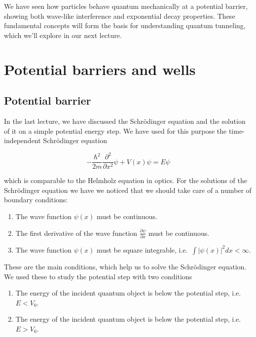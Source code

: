 \documentclass[
  a4paper,
]{book}
\providecommand{\tightlist}{%
  \setlength{\itemsep}{0pt}\setlength{\parskip}{0pt}}
\begin{document}
We have seen how particles behave quantum mechanically at a potential
barrier, showing both wave-like interference and exponential decay
properties. These fundamental concepts will form the basis for
understanding quantum tunneling, which we'll explore in our next
lecture.

\chapter{Potential barriers and
wells}\label{potential-barriers-and-wells}

\section{Potential barrier}\label{potential-barrier}

In the last lecture, we have discussed the Schrödinger equation and the
solution of it on a simple potential energy step. We have used for this
purpose the time-independent Schrödinger equation

\[-\frac{\hbar^2}{2m}\frac{\partial^2}{\partial x^2}\psi + V(x)\psi = E\psi\]

which is comparable to the Helmholz equation in optics. For the
solutions of the Schrödinger equation we have we noticed that we should
take care of a number of boundary conditions:

\begin{enumerate}
\def\labelenumi{\arabic{enumi}.}
\tightlist
\item
  The wave function \(\psi(x)\) must be continuous.
\item
  The first derivative of the wave function
  \(\frac{\partial \psi}{\partial x}\) must be continuous.
\item
  The wave function \(\psi(x)\) must be square integrable,
  i.e.~\(\int |\psi(x)|^2 dx < \infty\).
\end{enumerate}

These are the main conditions, which help us to solve the Schrödinger
equation. We used these to study the potential step with two conditions

\begin{enumerate}
\def\labelenumi{\arabic{enumi}.}
\tightlist
\item
  The energy of the incident quantum object is below the potential step,
  i.e.~\(E < V_0\).
\item
  The energy of the incident quantum object is below the potential step,
  i.e.~\(E > V_0\).
\end{enumerate}
\end{document}
